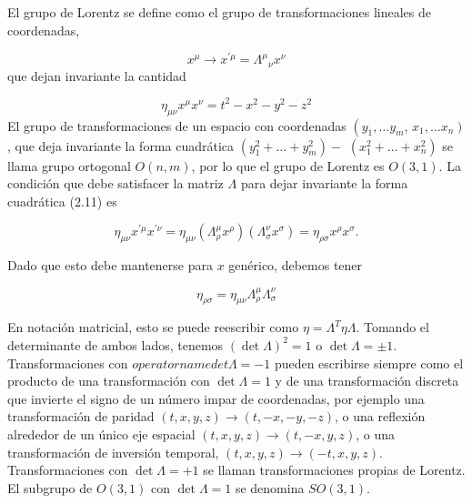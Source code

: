   El grupo de Lorentz se define como el grupo de transformaciones lineales de coordenadas,

  \begin{equation*}
    x^{\mu} \rightarrow x^{\prime \mu}=\Lambda^{\mu}{ }_{\nu} x^{\nu} \tag{2.10}
    \end{equation*}
    que dejan invariante la cantidad

    \begin{equation*}
      \eta_{\mu \nu} x^{\mu} x^{\nu}=t^{2}-x^{2}-y^{2}-z^{2} \tag{2.11}
      \end{equation*}
      El grupo de transformaciones de un espacio con coordenadas $\left(y_{1}, \ldots y_{m}\right.$, $\left.x_{1}, \ldots x_{n}\right)$, que deja invariante la forma cuadrática $\left(y_{1}^{2}+\ldots+y_{m}^{2}\right)-$ $\left(x_{1}^{2}+\ldots+x_{n}^{2}\right)$ se llama grupo ortogonal $O(n, m)$, por lo que el grupo de Lorentz es $O(3,1)$. La condición que debe satisfacer la matriz $\Lambda$ para dejar invariante la forma cuadrática (2.11) es

      \begin{equation*}
        \eta_{\mu \nu} x^{\prime \mu} x^{\prime \nu}=\eta_{\mu \nu}\left(\Lambda_{\rho}^{\mu} x^{\rho}\right)\left(\Lambda_{\sigma}^{\nu} x^{\sigma}\right)=\eta_{\rho \sigma} x^{\rho} x^{\sigma} . \tag{2.12}
        \end{equation*}

        Dado que esto debe mantenerse para $x$ genérico, debemos tener

        \begin{equation*}
          \eta_{\rho \sigma}=\eta_{\mu \nu} \Lambda_{\rho}^{\mu} \Lambda_{\sigma}^{\nu} \tag{2.13}
          \end{equation*}

          En notación matricial, esto se puede reescribir como $\eta=\Lambda^{T} \eta \Lambda$. Tomando el determinante de ambos lados, tenemos $(\operatorname{det} \Lambda)^{2}=1$ o $\operatorname{det} \Lambda= \pm 1$. Transformaciones con $operatorname{det} \Lambda=-1$ pueden escribirse siempre como el producto de una transformación con $\operatorname{det} \Lambda=1$ y de una transformación discreta que invierte el signo de un número impar de coordenadas, por ejemplo una transformación de paridad $(t, x, y, z) \rightarrow(t,-x,-y,-z)$, o una reflexión alrededor de un único eje espacial $(t, x, y, z) \rightarrow(t,-x, y, z)$, o una transformación de inversión temporal, $(t, x, y, z) \rightarrow(-t, x, y, z)$. Transformaciones con $\operatorname{det} \Lambda=+1$ se llaman transformaciones propias de Lorentz. El subgrupo de $O(3,1)$ con $\operatorname{det} \Lambda=1$ se denomina $S O(3,1)$.


